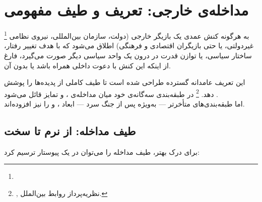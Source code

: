 \section{مداخله‌ی خارجی: تعریف و طیف مفهومی}
\label{sec:ch01-intervention-def}

\begin{tcolorbox}[defbox, title={تعریف: مداخله‌ی خارجی}]
%
\footnote{}
به هرگونه کنش عمدی یک بازیگر خارجی (دولت، سازمان بین‌المللی، نیروی
نظامی غیردولتی، یا حتی بازیگران اقتصادی و فرهنگی) اطلاق می‌شود که
با هدف تغییر رفتار، ساختار سیاسی، یا توازن قدرت در درون یک واحد
سیاسی دیگر صورت می‌گیرد، فارغ از اینکه این کنش با دعوت داخلی
همراه باشد یا بدون آن.
\end{tcolorbox}

این تعریف عامدانه گسترده طراحی شده است تا طیف کاملی از پدیده‌ها را پوشش
دهد. %
\footnote{,
نظریه‌پرداز روابط بین‌الملل.}
در طبقه‌بندی سه‌گانه‌ی خود میان مداخله‌ی ،
 و  تمایز قائل می‌شود%
.\\
اما طبقه‌بندی‌های متأخرتر --- به‌ویژه پس از جنگ سرد --- ابعاد ،  و  را نیز افزوده‌اند.

\subsection{طیف مداخله: از نرم تا سخت}
\label{subsec:ch01-spectrum}

برای درک بهتر، طیف مداخله را می‌توان در یک پیوستار ترسیم کرد:

